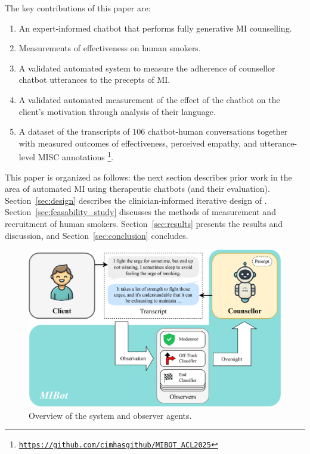 The key contributions of this paper are:\vspace{-0.2em}
\begin{enumerate}[itemsep=0pt, parsep=0pt]
    \item An expert-informed chatbot that performs fully generative MI counselling.
    \item Measurements of effectiveness on human smokers.
    \item A validated automated system to measure the adherence of counsellor chatbot utterances to the precepts of MI.
    \item A validated automated measurement of the effect of the chatbot on the client's motivation through analysis of their language.
    \item A dataset of the transcripts of  $106$ chatbot-human conversations together with measured outcomes of effectiveness, perceived empathy, and utterance-level MISC annotations \footnote{\texttt{\href{https://github.com/cimhasgithub/MIBOT_ACL2025}{https://github.com/cimhasgithub/MIBOT\_ACL2025}}}.
\end{enumerate}

This paper is organized as follows: the next section describes prior work in the area of automated MI using therapeutic chatbots (and their evaluation). Section~\ref{sec:design} describes the clinician-informed iterative design of \sysname. Section~\ref{sec:feasability_study}  discusses the methods of measurement and recruitment of human smokers. Section~\ref{sec:results} presents the results and discussion, and Section~\ref{sec:conclusion} concludes.

\begin{figure}[thpb!]
    \centering
    \includegraphics[width=0.8\linewidth]{fig/sysdiag.pdf}
    \caption{Overview of the \sysname system and observer agents.}
    \label{fig:system}
\end{figure}